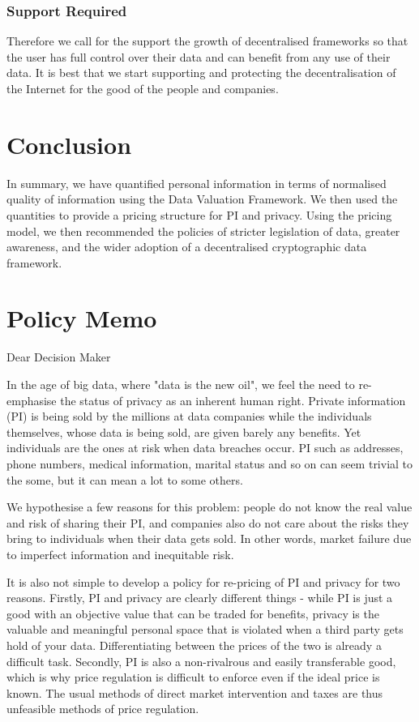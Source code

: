 \documentclass{icmmcm}
\begin{document}
\subsubsection{Support Required}
Therefore we call for the support the growth of decentralised frameworks so that the user has full control over their data and can benefit from any use of their data. It is best that we start supporting and protecting the decentralisation of the Internet for the good of the people and companies.

\section{Conclusion}
In summary, we have quantified personal information in terms of normalised quality of information using the Data Valuation Framework. We then used the quantities to provide a pricing structure for PI and privacy. Using the pricing model, we then recommended the policies of stricter legislation of data, greater awareness, and the wider adoption of a decentralised cryptographic data framework.

\newpage
\section{Policy Memo}
Dear Decision Maker %

In the age of big data, where "data is the new oil", we feel the need to re-emphasise the status of privacy as an inherent human right. Private information (PI) is being sold by the millions at data companies while the individuals themselves, whose data is being sold, are given barely any benefits. Yet individuals are the ones at risk when data breaches occur. PI such as addresses, phone numbers, medical information, marital status and so on can seem trivial to the some, but it can mean a lot to some others.

We hypothesise a few reasons for this problem: people do not know the real value and risk of sharing their PI, and companies also do not care about the risks they bring to individuals when their data gets sold. In other words, market failure due to imperfect information and inequitable risk.

It is also not simple to develop a policy for re-pricing of PI and privacy for two reasons. Firstly, PI and privacy are clearly different things - while PI is just a good with an objective value that can be traded for benefits, privacy is the valuable and meaningful personal space that is violated when a third party gets hold of your data. Differentiating between the prices of the two is already a difficult task.
Secondly, PI is also  a non-rivalrous and easily transferable good, which is why price regulation is difficult to enforce even if the ideal price is known. The usual methods of direct market intervention and taxes are thus unfeasible methods of price regulation. 
\end{document}
